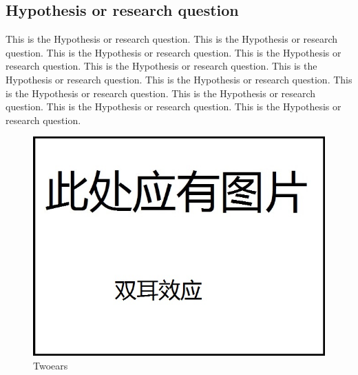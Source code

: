 \documentclass[12pt]{article}
\begin{document}
\begin{flushleft}
\subsection{Hypothesis or research question}
This is the Hypothesis or research question. This is the Hypothesis or research question. This is the Hypothesis or research question. This is the Hypothesis or research question. This is the Hypothesis or research question. This is the Hypothesis or research question. This is the Hypothesis or research question. This is the Hypothesis or research question. This is the Hypothesis or research question. This is the Hypothesis or research question. This is the Hypothesis or research question. 
\begin{figure}[h!]
	\begin{center}
		\includegraphics[scale = 0.6]{twoears.jpg}
		\caption{Twoears}
	\end{center}
\end{figure}

\end{flushleft}
\end{document}

